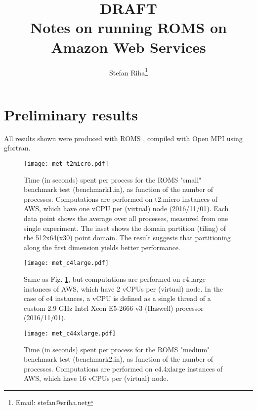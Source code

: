 \documentclass[12pt,a4paper]{article}
\title{
	{\bf DRAFT}\\
	Notes on running ROMS on Amazon Web Services 
}
\author{Stefan Riha\thanks{Email: stefan@sriha.net}}
\begin{document}
	\setlength{\parindent}{0cm}
	\maketitle

\section{Preliminary results}
	All results shown were produced with ROMS \citep{shchepetkin2005regional}, compiled with Open MPI using gfortran.
	
	\begin{figure}[H]
		\centering
		\texttt{[image: met\_t2micro.pdf]}
		\caption{Time (in seconds) spent per process for the ROMS "small" benchmark test (benchmark1.in), as function of the number of processes. Computations are performed on t2.micro instances of AWS, which have one vCPU per (virtual) node (2016/11/01). Each data point shows the average over all processes, measured from one single experiment. The inset shows the domain partition (tiling) of the 512x64(x30) point domain. The result suggests that partitioning along the first dimension yields better performance.}
		\label{fig:met_t2micro}
	\end{figure}

	\begin{figure}[H]
	\centering
	\texttt{[image: met\_c4large.pdf]}
	\caption{Same as Fig. \ref{fig:met_t2micro}, but computations are performed on c4.large instances of AWS, which have 2 vCPUs per (virtual) node. In the case of c4 instances, a vCPU is defined as a single thread of a custom 2.9 GHz Intel Xeon E5-2666 v3 (Haswell) processor (2016/11/01).}
	\label{fig:met_c4large}
\end{figure}

\begin{figure}[H]
	\centering
	\texttt{[image: met\_c44xlarge.pdf]}
	\caption{Time (in seconds) spent per process for the ROMS "medium" benchmark test (benchmark2.in), as function of the number of processes. Computations are performed on c4.4xlarge instances of AWS, which have 16 vCPUs per (virtual) node.}
	\label{fig:met_c4large}
\end{figure}
	


\end{document}

